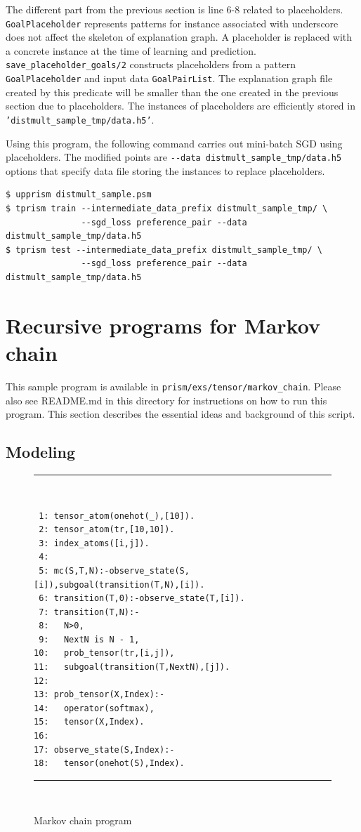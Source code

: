 \documentclass[a4paper]{report}
\begin{document}
The different part from the previous section is line 6-8  related to placeholders.
{\tt GoalPlaceholder} represents patterns for 
instance associated with underscore does not affect the skeleton of explanation graph.
A placeholder is replaced with a concrete instance at the time of learning and prediction.
{\tt save\_placeholder\_goals/2} constructs placeholders from a pattern {\tt GoalPlaceholder} and input data {\tt GoalPairList}.
The explanation graph file created by this predicate will be smaller than the one created in the previous section due to placeholders.
The instances of placeholders are efficiently stored in {\tt 'distmult\_sample\_tmp/data.h5'}.


Using this program, the following command carries out mini-batch SGD using placeholders.
The modified points are \verb|--data distmult_sample_tmp/data.h5| options that specify data file storing the instances to replace placeholders.
\begin{verbatim}
$ upprism distmult_sample.psm
$ tprism train --intermediate_data_prefix distmult_sample_tmp/ \
               --sgd_loss preference_pair --data distmult_sample_tmp/data.h5 
$ tprism test --intermediate_data_prefix distmult_sample_tmp/ \
               --sgd_loss preference_pair --data distmult_sample_tmp/data.h5 
\end{verbatim}

\section{Recursive programs for Markov chain}
\label{sec:markov_chain}

This sample program is available in \verb|prism/exs/tensor/markov_chain|.
Please also see README.md in this directory for instructions on how to run this program.
This section describes the essential ideas and background of this script. 

\subsection*{Modeling}

\begin{figure}[tb]
	\rule{0.85\textwidth}{0.10mm}\\ [-1em]
	\begin{verbatim}
 1: tensor_atom(onehot(_),[10]).
 2: tensor_atom(tr,[10,10]).
 3: index_atoms([i,j]).
 4: 
 5: mc(S,T,N):-observe_state(S,[i]),subgoal(transition(T,N),[i]).
 6: transition(T,0):-observe_state(T,[i]).
 7: transition(T,N):-
 8:   N>0,
 9:   NextN is N - 1,
10:   prob_tensor(tr,[i,j]),
11:   subgoal(transition(T,NextN),[j]).
12: 
13: prob_tensor(X,Index):-
14:   operator(softmax),
15:   tensor(X,Index).
16: 
17: observe_state(S,Index):-
18:   tensor(onehot(S),Index).
	\end{verbatim}
	\rule{0.85\textwidth}{0.10mm}\\ [-1em]
	\caption{Markov chain program}
	\label{fig:mc}
\end{figure}
\end{document}
